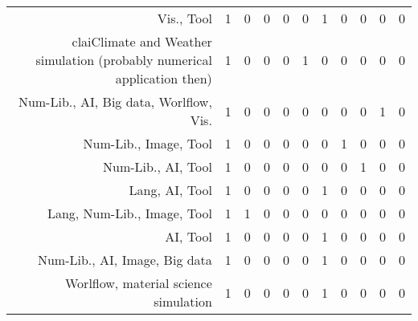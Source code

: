 {\begin{landscape}
\begin{longtable}[htb]{r|c|c|c|c|c|c|c|c|c|c}
{Vis., Tool} & 1 & 0 & 0 & 0 & 0 & 1 & 0 & 0 & 0 & 0 \\%
{claiClimate and Weather simulation (probably numerical application then)} & 1 & 0 & 0 & 0 & 1 & 0 & 0 & 0 & 0 & 0 \\%
{Num-Lib., AI, Big data, Worlflow, Vis.} & 1 & 0 & 0 & 0 & 0 & 0 & 0 & 0 & 1 & 0 \\%
{Num-Lib., Image, Tool} & 1 & 0 & 0 & 0 & 0 & 0 & 1 & 0 & 0 & 0 \\%
{Num-Lib., AI, Tool} & 1 & 0 & 0 & 0 & 0 & 0 & 0 & 1 & 0 & 0 \\%
{Lang, AI, Tool} & 1 & 0 & 0 & 0 & 0 & 1 & 0 & 0 & 0 & 0 \\%
{Lang, Num-Lib., Image, Tool} & 1 & 1 & 0 & 0 & 0 & 0 & 0 & 0 & 0 & 0 \\%
{AI, Tool} & 1 & 0 & 0 & 0 & 0 & 1 & 0 & 0 & 0 & 0 \\%
{Num-Lib., AI, Image, Big data} & 1 & 0 & 0 & 0 & 0 & 1 & 0 & 0 & 0 & 0 \\%
{Worlflow, material science simulation} & 1 & 0 & 0 & 0 & 0 & 1 & 0 & 0 & 0 & 0 \\%
\hline%
\end{longtable}%
\end{landscape}}%
\clearpage%
